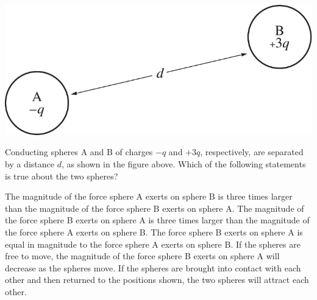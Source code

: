 
\begin{center}
    \includegraphics[scale=0.3]{images/img-005-004.png}
\end{center}

\begin{questions}
\setcounter{question}{6}

\question
Conducting spheres A and B of charges $-q$ and $+3q$, respectively, are separated by a distance $d$, as shown in the figure above.
Which of the following statements is true about the two spheres?

\begin{choices}
    \choice The magnitude of the force sphere A exerts on sphere B is three times larger than the magnitude of the force sphere B exerts on sphere A.
    \choice The magnitude of the force sphere B exerts on sphere A is three times larger than the magnitude of the force sphere A exerts on sphere B.
    \choice The force sphere B exerts on sphere A is equal in magnitude to the force sphere A exerts on sphere B.
    \choice If the spheres are free to move, the magnitude of the force sphere B exerts on sphere A will decrease as the spheres move.
    \choice If the spheres are brought into contact with each other and then returned to the positions shown, the two spheres will attract each other.
\end{choices}

\end{questions}
